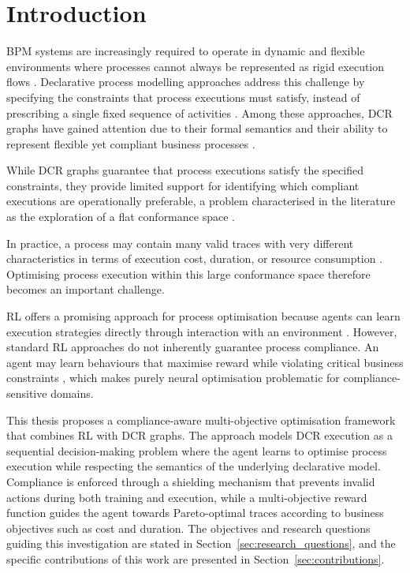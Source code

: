 
\chapter{Introduction}
\label{chap:introduction}

\ac{BPM} systems are increasingly required to operate in dynamic and
flexible environments where processes cannot always be represented as
rigid execution flows \cite{Reichert2012EnablingTechnologies}.
Declarative process modelling approaches address this challenge by
specifying the constraints that process executions must satisfy, instead
of prescribing a single fixed sequence of activities \cite{PesicDECLARE:Processes}.
Among these approaches, \ac{DCR} graphs have gained attention due to
their formal semantics and their ability to represent flexible yet
compliant business processes \cite{Hildebrandt2011DeclarativeGraphs}.

While \ac{DCR} graphs guarantee that process executions satisfy the
specified constraints, they provide limited support for identifying
which compliant executions are operationally preferable, a problem
characterised in the literature as the exploration of a flat conformance
space \cite{Burattin2021ExploringSpace}.

In practice, a process may contain many valid traces with very different
characteristics in terms of execution cost, duration, or resource
consumption \cite{Diaz2024Pareto-OptimalModels}.
Optimising process execution within this large conformance space
therefore becomes an important challenge.

\ac{RL} offers a promising approach for process optimisation because
agents can learn execution strategies directly through interaction with
an environment \cite{Sutton2018ReinforcementIntroduction}.
However, standard \ac{RL} approaches do not inherently guarantee process
compliance. An agent may learn behaviours that maximise reward while
violating critical business constraints
\cite{Garcia2015ALearning}, which makes purely neural
optimisation problematic for compliance-sensitive domains.

This thesis proposes a compliance-aware multi-objective optimisation
framework that combines \ac{RL} with \ac{DCR} graphs.
The approach models \ac{DCR} execution as a sequential decision-making
problem where the agent learns to optimise process execution while
respecting the semantics of the underlying declarative model.
Compliance is enforced through a shielding mechanism
\cite{Alshiekh2017SafeShielding} that prevents invalid actions during both training
and execution, while a multi-objective reward function guides the agent
towards Pareto-optimal traces according to business objectives such as
cost and duration.
The objectives and research questions guiding this investigation are
stated in Section~\ref{sec:research_questions}, and the specific
contributions of this work are presented in
Section~\ref{sec:contributions}.

